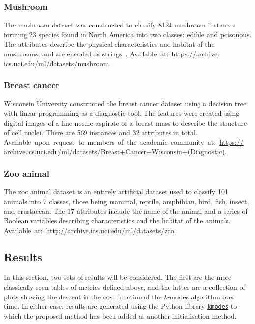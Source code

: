 \subsubsection*{Mushroom}

The mushroom dataset was constructed to classify 8124 mushroom instances forming
23 species found in North America into two classes: edible and poisonous. The
attributes describe the physical characteristics and habitat of the mushrooms,
and are encoded as strings~\cite{Mushroom}. Available~at:~\url{https://archive.
ics.uci.edu/ml/datasets/mushroom}.

\subsubsection*{Breast cancer}

Wisconsin University constructed the breast cancer dataset using a decision tree
with linear programming as a diagnostic tool. The features were created using
digital images of a fine needle aspirate of a breast mass to describe the
structure of cell nuclei. There are 569 instances and 32 attributes in total.
Available~upon~request~to~members~of~the~academic~community~at:~\url{https://
archive.ics.uci.edu/ml/datasets/Breast+Cancer+Wisconsin+(Diagnostic)}.

\subsubsection*{Zoo animal}

The zoo animal dataset is an entirely artificial dataset used to classify 101
animals into 7 classes, those being mammal, reptile, amphibian, bird, fish,
insect, and crustacean. The 17 attributes include the name of the animal and a
series of Boolean variables describing characteristics and the habitat of the
animals. Available~at:~\url{http://archive.ics.uci.edu/ml/datasets/zoo}.

\subsection{Results}\label{subsec:results}

In this section, two sets of results will be considered. The first are the more
classically seen tables of metrics defined above, and the latter are a
collection of plots showing the descent in the cost function of the \(k\)-modes
algorithm over time. In either case, results are generated using the Python
library \href{https://github.com/nicodv/kmodes}{\texttt{kmodes}} to which the
proposed method has been added as another initialisation method.

